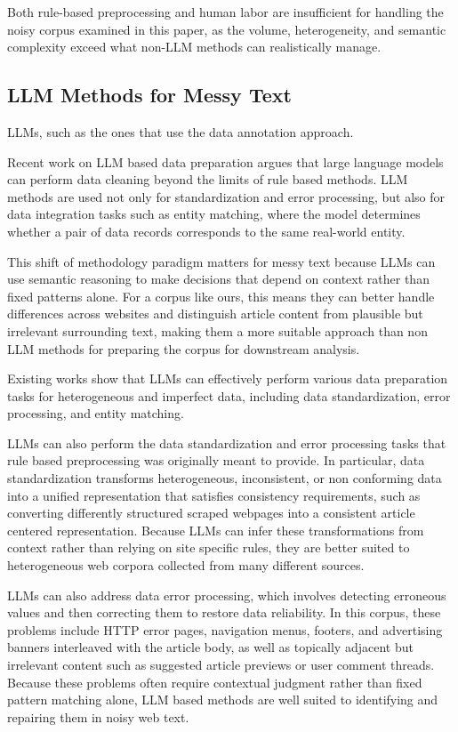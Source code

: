 \documentclass{article}
\begin{document}
Both rule-based preprocessing and human labor are insufficient for handling the noisy corpus examined in this paper, as the volume, heterogeneity, and semantic complexity exceed what non-LLM methods can realistically manage.

\subsection{LLM Methods for Messy
Text}\label{llm-methods-for-messy-text}

LLMs, such as the ones that use the data annotation approach.

Recent work on LLM based data preparation argues that large language models can perform data cleaning beyond the limits of rule based methods. LLM methods are used not only for standardization and error processing, but also for data integration tasks such as entity matching, where the model determines whether a pair of data records corresponds to the same real-world entity.

This shift of methodology paradigm matters for messy text because LLMs can use semantic reasoning to make decisions that depend on context rather than fixed patterns alone. For a corpus like ours, this means they can better handle differences across websites and distinguish article content from plausible but irrelevant surrounding text, making them a more suitable approach than non LLM methods for preparing the corpus for downstream analysis.

Existing works show that LLMs can effectively perform various data preparation tasks for heterogeneous and imperfect data, including data standardization, error processing, and entity matching.

LLMs can also perform the data standardization and error processing tasks that rule based preprocessing was originally meant to provide. In particular, data standardization transforms heterogeneous, inconsistent, or non conforming data into a unified representation that satisfies consistency requirements, such as converting differently structured scraped webpages into a consistent article centered representation. Because LLMs can infer these transformations from context rather than relying on site specific rules, they are better suited to heterogeneous web corpora collected from many different sources.

LLMs can also address data error processing, which involves detecting erroneous values and then correcting them to restore data reliability. In this corpus, these problems include HTTP error pages, navigation menus, footers, and advertising banners interleaved with the article body, as well as topically adjacent but irrelevant content such as suggested article previews or user comment threads. Because these problems often require contextual judgment rather than fixed pattern matching alone, LLM based methods are well suited to identifying and repairing them in noisy web text.
\end{document}
